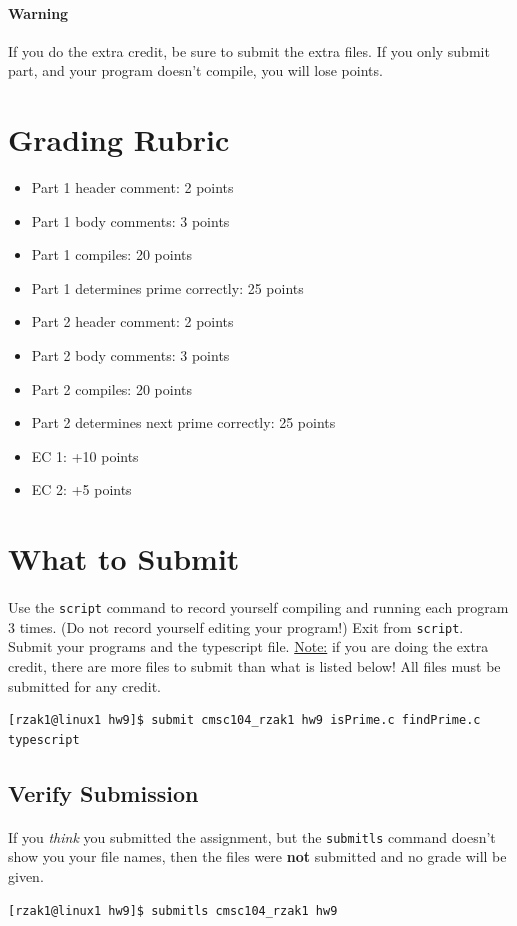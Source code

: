 \documentclass[letter,11pt]{article}
\begin{document}
\paragraph{Warning}If you do the extra credit, be sure to submit the extra files. If you only submit part, and your program doesn't compile, you will lose points.

\section*{Grading Rubric}
\begin{itemize}
    \item Part 1 header comment: 2 points
    \item Part 1 body comments: 3 points
    \item Part 1 compiles: 20 points
    \item Part 1 determines prime correctly: 25 points
    \item Part 2 header comment: 2 points
    \item Part 2 body comments: 3 points
    \item Part 2 compiles: 20 points
    \item Part 2 determines next prime correctly: 25 points
    \item EC 1: +10 points
    \item EC 2:  +5 points
\end{itemize}

\section*{What to Submit}
\paragraph{}Use the \texttt{script} command to record yourself compiling and running each program 3 times. (Do not record yourself editing your program!) Exit from \texttt{script}. Submit your programs and the typescript file. \underline{Note:} if you are doing the extra credit, there are more files to submit than what is listed below! All files must be submitted for any credit.
\begin{verbatim}
[rzak1@linux1 hw9]$ submit cmsc104_rzak1 hw9 isPrime.c findPrime.c typescript
\end{verbatim}

\subsection*{Verify Submission}
\paragraph{}If you \textit{think} you submitted the assignment, but the \texttt{submitls} command doesn't show you your file names, then the files were \textbf{not} submitted and no grade will be given.
\begin{verbatim}
[rzak1@linux1 hw9]$ submitls cmsc104_rzak1 hw9
\end{verbatim}
\end{document}
